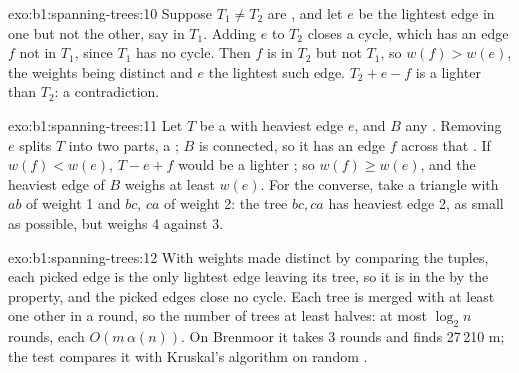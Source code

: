 \begin{solution}{exo:b1:spanning-trees:10}
Suppose $T_1 \neq T_2$ are , and let $e$ be the lightest edge in one but not the other, say in
$T_1$. Adding $e$ to $T_2$ closes a cycle, which has an edge $f$ not in $T_1$, since $T_1$ has no cycle. Then $f$ is in
$T_2$ but not $T_1$, so $w(f) > w(e)$, the weights being distinct and $e$ the lightest such edge. $T_2 + e - f$ is a
 lighter than $T_2$: a contradiction.
\end{solution}

\begin{solution}{exo:b1:spanning-trees:11}
Let $T$ be a  with heaviest edge $e$, and $B$ any . Removing $e$ splits $T$ into two
parts, a ; $B$ is connected, so it has an edge $f$ across that . If $w(f) < w(e)$, $T - e + f$ would be a lighter
; so $w(f) \geq w(e)$, and the heaviest edge of $B$ weighs at least $w(e)$. For the converse, take a
triangle with $ab$ of weight 1 and $bc$, $ca$ of weight 2: the tree $bc, ca$ has heaviest edge 2, as small as possible,
but weighs 4 against 3.
\end{solution}

\begin{solution}{exo:b1:spanning-trees:12}
With weights made distinct by comparing the tuples, each picked edge is the only lightest edge leaving its tree, so it
is in the  by the  property, and the picked edges close no cycle. Each tree is merged with at
least one other in a round, so the number of trees at least halves: at most $\log_2 n$ rounds, each $O(m\, \alpha(n))$.
On Brenmoor it takes 3 rounds and finds 27\,210 m; the test compares it with Kruskal's algorithm on random .
\end{solution}


